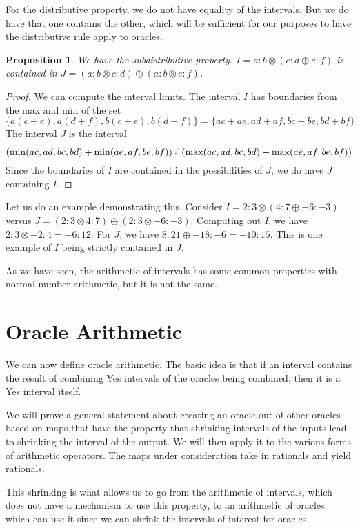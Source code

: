 \documentclass[12pt]{article}
\newtheorem{proposition}{Proposition}[subsection]
\begin{document}
For the distributive property, we do not have equality of the intervals. But we do have that one contains the other, which will be sufficient for our purposes to have the distributive rule apply to oracles. 

\begin{proposition}
We have the subdistributive property: $I = a:b\otimes(c:d \oplus e:f)$ is contained in $J = (a:b \otimes c:d) \oplus (a:b \otimes e:f)$. 
\end{proposition}

\begin{proof}
We can compute the interval limits. The interval $I$ has boundaries from the max and min of the set 
\[
\{a(c+e), a(d+f), b(c+e), b(d+f)\} = \{ac+ae, ad+af, bc+be, bd+bf\}
\] 
The interval $J$ is the interval 
\[
(\min(ac, ad, bc, bd) + \min(ae, af, be, bf) ) \lte (\max(ac, ad, bc, bd) + \max(ae, af, be, bf) )
\]
Since the boundaries of $I$ are contained in the possibilities of $J$, we do have $J$ containing $I$.
\end{proof}

Let us do an example demonstrating this. Consider $I = 2:3 \otimes ( 4:7 \oplus -6:-3)$ versus $J = (2:3 \otimes 4:7) \oplus (2:3 \otimes -6:-3)$. Computing out $I$, we have $2:3 \otimes -2:4 = -6:12$. For $J$, we have $8:21 \oplus -18:-6 = -10: 15$. This is one example of $I$ being strictly contained in $J$. 

As we have seen, the arithmetic of intervals has some common properties with normal number arithmetic, but it is not the same.

\section{Oracle Arithmetic}

We can now define oracle arithmetic. The basic idea is that if an interval contains the result of combining Yes intervals of the oracles being combined, then it is a Yes interval itself. 

We will prove a general statement about creating an oracle out of other oracles based on maps that have the property that shrinking intervals of the inputs lead to shrinking the interval of the output. We will then apply it to the various forms of arithmetic operators. The maps under consideration take in rationals and yield rationals. 

This shrinking is what allows us to go from the arithmetic of intervals, which does not have a mechanism to use this property, to an arithmetic of oracles, which can use it since we can shrink the intervals of interest for oracles. 
\end{document}
